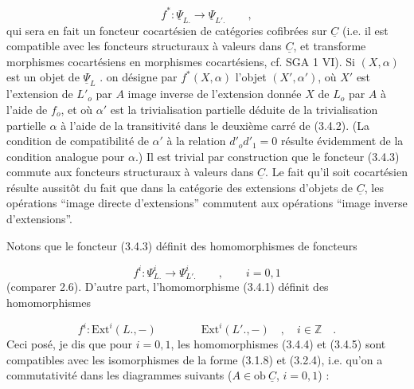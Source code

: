 \begin{equation}\tag{3.4.3}
f^* : \underline{\Psi}_{L.} \longrightarrow \underline{\Psi}_{L'.} \qquad ,
\end{equation}
qui sera en fait un foncteur cocartésien de catégories cofibrées sur $\underline{C}$ (i.e. il est compatible avec les foncteurs structuraux à valeurs dans $\underline{C}$, et transforme morphismes cocartésiens en morphismes cocartésiens, cf. SGA 1 VI). Si $(X,\alpha)$ est un objet de $\underline{\Psi}_L$ . on désigne par $f^*(X,\alpha)$ l'objet
$(X',\alpha')$, où $X'$ est l'extension de $L'_o$ par $A$ image inverse de l'extension donnée $X$ de $L_o$ par $A$ à l'aide de $f_o$, et où $\alpha'$ est la trivialisation partielle déduite de la trivialisation partielle $\alpha$ à l'aide de la transitivité dans le deuxième carré de (3.4.2). (La condition de compatibilité de $\alpha'$ à la relation $d'_o d'_1 = 0$ résulte évidemment de la condition analogue pour $\alpha$.) Il est trivial par construction que le foncteur (3.4.3) commute aux foncteurs structuraux à valeurs dans $\underline{C}$. Le fait qu'il soit cocartésien résulte aussitôt du fait que dans la catégorie des extensions d'objets de $\underline{C}$, les opérations ``image directe d'extensions'' commutent aux opérations ``image inverse d'extensions''.

Notons que le foncteur (3.4.3) définit des homomorphismes de foncteurs

\begin{equation}\tag{3.4.4}
f^i : \Psi^i_{L.} \longrightarrow \Psi^i_{L'.} \qquad , \qquad i=0,1
\end{equation}
(comparer 2.6). D'autre part, l'homomorphisme (3.4.1) définit des homomorphismes

\begin{equation}\tag{3.4.5}
f^i : \mathrm{Ext}^i(L.,-) \qquad\qquad \mathrm{Ext}^i(L'.,-) \quad , \quad i \in \mathbb{Z} \quad .
\end{equation}
Ceci posé, je dis que pour $i=0,1$, les homomorphismes (3.4.4) et (3.4.5) sont compatibles avec les isomorphismes de la forme (3.1.8) et (3.2.4), i.e. qu'on a commutativité dans les diagrammes suivants ($A \in \mathrm{ob}\ \underline{C}$, $i=0,1$) :

